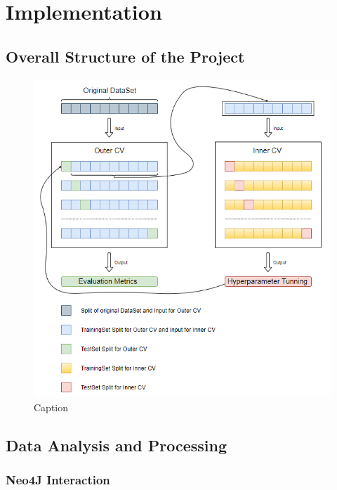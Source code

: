 
    
    \chapter{Implementation}
    
    \section{Overall Structure of the Project}
    
    \begin{figure}[H]
        \centering
        \includegraphics[scale=1]{Images/nested_cv.png}
        \caption{Caption}
        \label{NestedCV}
    \end{figure}
    
    \section{Data Analysis and Processing}
    
        \subsection{}
        
        \subsection{Neo4J Interaction}
        
